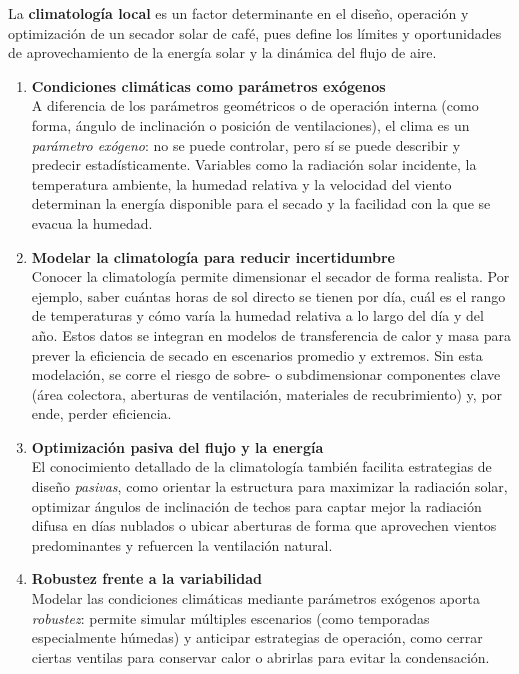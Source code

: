 \documentclass[12pt]{article}
\begin{document}
La \textbf{climatología local} es un factor determinante en el diseño, operación y optimización de un secador solar de café, pues define los límites y oportunidades de aprovechamiento de la energía solar y la dinámica del flujo de aire.

\begin{enumerate}
    \item \textbf{Condiciones climáticas como parámetros exógenos} \\
    A diferencia de los parámetros geométricos o de operación interna (como forma, ángulo de inclinación o posición de ventilaciones), el clima es un \emph{parámetro exógeno}: no se puede controlar, pero sí se puede describir y predecir estadísticamente. Variables como la radiación solar incidente, la temperatura ambiente, la humedad relativa y la velocidad del viento determinan la energía disponible para el secado y la facilidad con la que se evacua la humedad.

    \item \textbf{Modelar la climatología para reducir incertidumbre} \\
    Conocer la climatología permite dimensionar el secador de forma realista. Por ejemplo, saber cuántas horas de sol directo se tienen por día, cuál es el rango de temperaturas y cómo varía la humedad relativa a lo largo del día y del año. Estos datos se integran en modelos de transferencia de calor y masa para prever la eficiencia de secado en escenarios promedio y extremos. Sin esta modelación, se corre el riesgo de sobre- o subdimensionar componentes clave (área colectora, aberturas de ventilación, materiales de recubrimiento) y, por ende, perder eficiencia.

    \item \textbf{Optimización pasiva del flujo y la energía} \\
    El conocimiento detallado de la climatología también facilita estrategias de diseño \emph{pasivas}, como orientar la estructura para maximizar la radiación solar, optimizar ángulos de inclinación de techos para captar mejor la radiación difusa en días nublados o ubicar aberturas de forma que aprovechen vientos predominantes y refuercen la ventilación natural.

    \item \textbf{Robustez frente a la variabilidad} \\
    Modelar las condiciones climáticas mediante parámetros exógenos aporta \emph{robustez}: permite simular múltiples escenarios (como temporadas especialmente húmedas) y anticipar estrategias de operación, como cerrar ciertas ventilas para conservar calor o abrirlas para evitar la condensación.

\end{enumerate}
\end{document}
